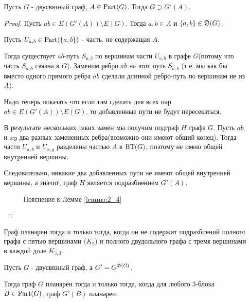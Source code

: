 \begin{lm}[Лемма 2.4] \label{lemma:2_4}
	Пусть $G$ - двусвязный граф,  $A \in \operatorname{Part}(G)$.
	Тогда  $G \supset G'(A)$.
\end{lm}
\begin{proof}
	Пусть $ab \in E(G'(A)) \setminus E(G)$.
	Тогда  $a, b \in A$ и  $\{a, b\} \in \mathfrak{D}(G)$. 

	Пусть $U_{a, b} \in \operatorname{Part}(\{a, b\})$ - часть, не содержащая $A$.

	Тогда существует  $ab$-путь $S_{a, b}$ по вершинам части  $U_{a, b}$ в графе $G$(потому что часть $S_{a, b}$ связна в $G$).
	Заменим ребро  $ab$ на этот путь  $S_{a, b}$ (т.е. мы как бы вместо одного прямого ребра $ab$ сделали длинной ребро-путь по вершинам не из $A$).

	Надо теперь показать что если там сделать для всех пар $ab \in E(G'(A)) \setminus E(G)$, то добавленные пути не будут пересекаться.

	В результате нескольких таких замен мы получим подграф $H$ графа  $G$.
	Пусть $ab$ и  $xy$ два разных замененных ребра(возможно они имеют общий конец).
	Тогда части  $U_{a, b}$ и  $U_{x, y}$ разделены частью  $A$ в  $\operatorname{BT}(G)$, поэтому не имею общей внутренней вершины.

	Следовательно, никакие два добавленных пути не имеют общей внутренней вершины, а значит, граф $H$ является подразбиением  $G'(A)$.
	
\begin{figure}[ht]
    \centering
	\caption{Пояснение к Лемме \ref{lemma:2_4}}
    \label{fig:lemma_2_4}
\end{figure}

\end{proof}


\begin{remrk} \label{theorem:pontyagin_kuratowski}
	Граф планарен тогда и только тогда, когда он не содержит подразбиений полного графа с пятью вершинами ($K_5$) и полного двудольного графа с тремя вершинами в каждой доле $K_{3,3}$.
\end{remrk}

\begin{thm} \label{theorem:2_3}
	Пусть $G$ - двусвязный граф, а  $G' = G^{\mathfrak{D}(G)}$.

	Тогда граф  $G$ планарен тогда и только тогда, когда для любого 3-блока  $B \in \operatorname{Part}(G)$, граф  $G'(B)$ планарен.
\end{thm}

